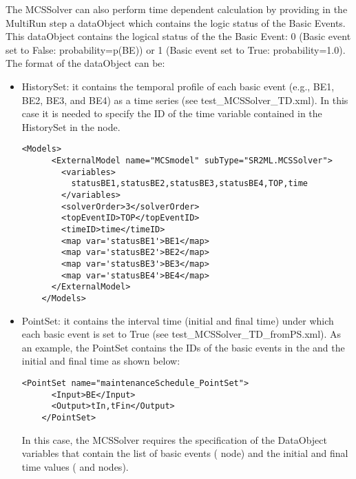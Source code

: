 The MCSSolver can also perform time dependent calculation by providing in the MultiRun step a dataObject which
contains the logic status of the Basic Events.
This dataObject contains the logical status of the the Basic Event: 0 (Basic event set to False: probability=p(BE))
or 1 (Basic event set to True: probability=1.0).
The format of the dataObject can be:
\begin{itemize}
  \item HistorySet: it contains the temporal profile of each basic event (e.g., BE1, BE2, BE3, and BE4) as a time
                    series (see test\_MCSSolver\_TD.xml). In this case it is needed to specify the ID of the time variable
                    contained in the HistorySet in the  node.

   \begin{lstlisting}[style=XML,morekeywords={anAttribute},caption=Time dependent (from HistorySet) MCSSolver model input example., label=lst:MCSSolver_InputExample]
     <Models>
      <ExternalModel name="MCSmodel" subType="SR2ML.MCSSolver">
        <variables>
          statusBE1,statusBE2,statusBE3,statusBE4,TOP,time
        </variables>
        <solverOrder>3</solverOrder>
        <topEventID>TOP</topEventID>
        <timeID>time</timeID>
        <map var='statusBE1'>BE1</map>
        <map var='statusBE2'>BE2</map>
        <map var='statusBE3'>BE3</map>
        <map var='statusBE4'>BE4</map>
      </ExternalModel>
    </Models>
  \end{lstlisting}

  \item PointSet: it contains the interval time (initial and final time) under which each basic event is set to
                  True (see test\_MCSSolver\_TD\_fromPS.xml). As an example, the PointSet contains the IDs of the basic events
                  in the and the initial and final time as shown below:

   \begin{lstlisting}[style=XML,morekeywords={anAttribute},caption= Example of PointSet for time dependent MCSSolver calculation., label=lst:MCSSolver_InputExample]
    <PointSet name="maintenanceSchedule_PointSet">
      <Input>BE</Input>
      <Output>tIn,tFin</Output>
    </PointSet>
    \end{lstlisting}

                  In this case, the MCSSolver requires the specification of the DataObject variables that contain the list of basic events
                  ( node) and the initial and final time values ( and  nodes).


\end{itemize}
